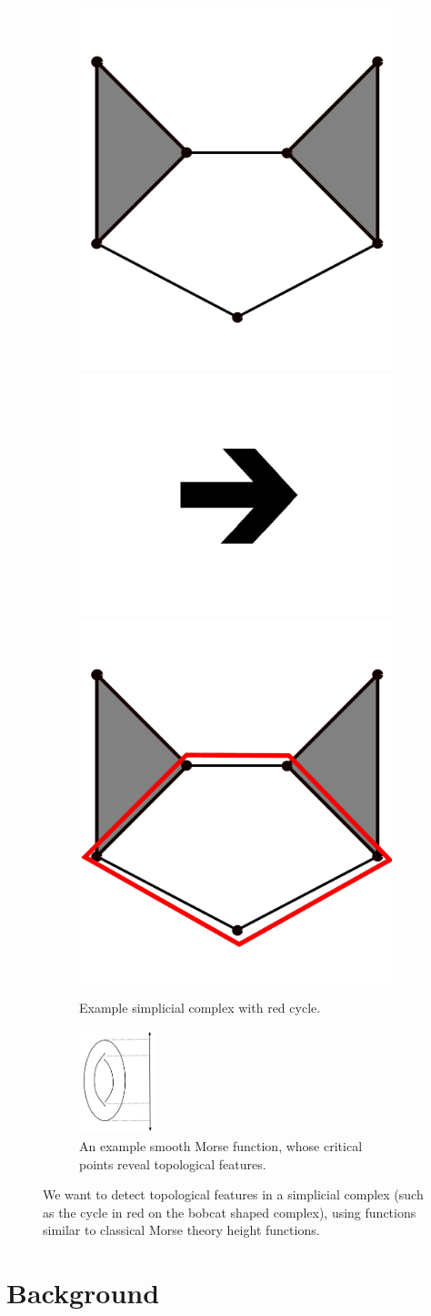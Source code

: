 \documentclass[11pt]{article}
\begin{document}
\begin{figure}
\centering
\begin{subfigure}{.5\textwidth}
  \centering
	\includegraphics[width=.25\linewidth]{cat.pdf}
	\includegraphics[width=.25\linewidth]{arrow.pdf}
	\includegraphics[width=.25\linewidth]{redcat.pdf}
	\caption{Example simplicial complex with red cycle.}
  \label{fig:sub1}
\end{subfigure}%
\begin{subfigure}{.5\textwidth}
  \centering
  \includegraphics[width=.4\linewidth, height=3cm]{torus.pdf}
	\caption{An example smooth Morse function, whose critical points reveal topological features.}
  \label{fig:sub2}
\end{subfigure}
	\caption{We want to detect topological features in a simplicial complex (such as the cycle in red on the bobcat shaped complex), using functions similar to classical Morse theory height functions.}
\label{fig:test}
\end{figure}


\section{Background}
\end{document}
